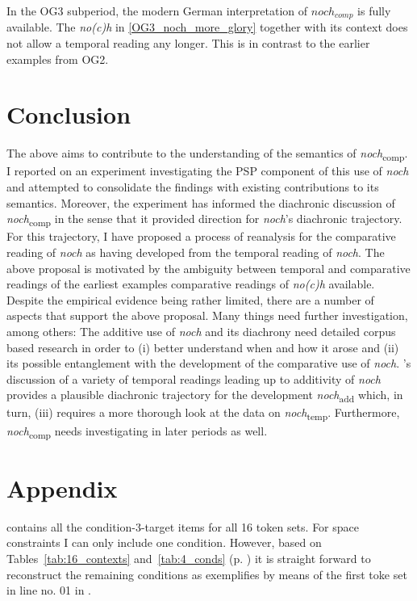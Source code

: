 \documentclass[output=paper,
modfonts
]{langscibook}
\begin{document}
In the OG3 subperiod, the modern German interpretation of $noch_{comp}$ is fully available. The \textit{no(c)h} in \ref{OG3_noch_more_glory} together with its context does not allow a temporal reading any longer. This is in contrast to the earlier examples from OG2.

\section{Conclusion}

The above aims to contribute to the understanding of the semantics of \textit{noch}\textsubscript{comp}. I reported on an experiment investigating the PSP component of this use of \textit{noch} and attempted to consolidate the findings with existing contributions to its semantics. Moreover, the experiment has informed the diachronic discussion of \textit{noch}\textsubscript{comp} in the sense that it provided direction for \textit{noch}'s diachronic trajectory. For this trajectory, I have proposed a process of reanalysis for the comparative reading of \textit{noch} as having developed from the temporal reading of \textit{noch}. The above proposal is motivated by the ambiguity between temporal and comparative readings of the earliest examples comparative readings of \textit{no(c)h} available. Despite the empirical evidence being rather limited, there are a number of aspects that support the above proposal. Many things need further investigation, among others: The additive use of \textit{noch} and its diachrony need detailed corpus based research in order to (i) better understand when and how it arose and (ii) its possible entanglement with the development of the comparative use of \textit{noch}. \citeauthor{beck2016a_sub}'s \citeyearpar{beck2016a_sub} discussion of a variety of temporal readings leading up to additivity of \textit{noch} provides a plausible diachronic trajectory for the development \textit{noch}\textsubscript{add} which, in turn, (iii) requires a more thorough look at the data on \textit{noch}\textsubscript{temp}. Furthermore, \textit{noch}\textsubscript{comp} needs investigating in later periods as well.


{\sloppy\printbibliography[heading=subbibliography,notkeyword=this]}



\section*{Appendix}
 contains all the condition-3-target items for all 16 token sets. For space constraints I can only include one condition. However, based on Tables~\ref{tab:16_contexts} and~\ref{tab:4_conds} (p. \pageref{tab:4_conds}) it is straight forward to reconstruct the remaining conditions as  exemplifies by means of the first toke set in line no. 01 in .
\end{document}

